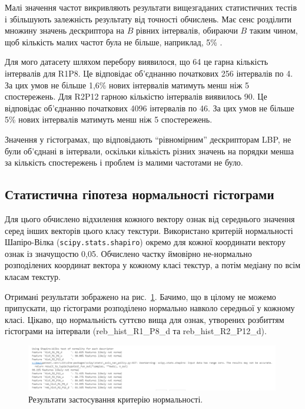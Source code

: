 Малі значення частот викривляють результати вищезгаданих статистичних тестів і збільшують залежність результату від точності обчислень.
Має сенс розділити множину значень дескриптора на $B$ рівних інтервалів, обираючи $B$ таким чином, щоб кількість малих частот була не більше, наприклад, 5\% \cite{ojala2002}.

Для мого датасету шляхом перебору виявилося, що 64 це гарна кількість інтервалів для R1P8. 
Це відповідає об'єднанню початкових 256 інтервалів по 4. 
За цих умов не більше 1,6\% нових інтервалів матимуть менш ніж 5 спостережень.
Для R2P12 гарною кількістю інтервалів виявилось 90. 
Це відповідає об'єднанню початкових 4096 інтервалів по 46. 
За цих умов не більше 5\% нових інтервалів матимуть менш ніж 5 спостережень.

Значення у гістограмах, що відповідають ``рівномірним'' дескрипторам LBP, не були об'єднані в інтервали, 
оскільки кількість різних значень на порядки менша за кількість спостережень і проблем із малими частотами не було.

\subsection{Статистична гіпотеза нормальності гістограми}\label{section2.1c1}\hfill

Для цього обчислено відхилення кожного вектору ознак від середнього значення серед інших векторів цього класу текстури.
Використано критерій нормальності Шапіро-Вілка (\verb|scipy.stats.shapiro|) окремо для кожної координати вектору ознак із значущостю 0,05.
Обчислено частку ймовірно не-нормально розподілених координат вектора у кожному класі текстур, а потім медіану по всім класам текстур.

Отримані результати зображено на рис.~\ref{fig:normaltest}. 
Бачимо, що в цілому не можемо припускати, що гістограми розподілено нормально навколо середньої у кожному класі.
Цікаво, що нормальність суттєво вища для ознак, утворених розбиттям гістограми на інтервали (reb\_hist\_R1\_P8\_d та reb\_hist\_R2\_P12\_d).

\begin{figure}[h]
    \centering
    \includegraphics[width=0.99\textwidth]{img/normality-test.png}
    \caption{
        Результати застосування критерію нормальності.
    }
    \label{fig:normaltest}
\end{figure}

